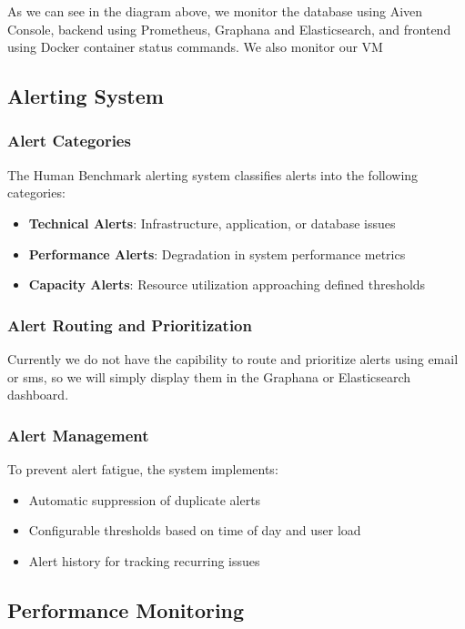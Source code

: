 As we can see in the diagram above, we monitor the database using Aiven Console,
backend using Prometheus, Graphana and Elasticsearch, and frontend using Docker
container status commands. We also monitor our VM

\subsection{Alerting System}

\subsubsection{Alert Categories}

The Human Benchmark alerting system classifies alerts into the following categories:

\begin{itemize}
    \item \textbf{Technical Alerts}: Infrastructure, application, or database issues
    \item \textbf{Performance Alerts}: Degradation in system performance metrics
    \item \textbf{Capacity Alerts}: Resource utilization approaching defined thresholds
\end{itemize}

\subsubsection{Alert Routing and Prioritization}
Currently we do not have the capibility to route and prioritize alerts using
email or sms, so we will simply display them in the Graphana or Elasticsearch
dashboard.

\subsubsection{Alert Management}

To prevent alert fatigue, the system implements:

\begin{itemize}
    \item Automatic suppression of duplicate alerts
    \item Configurable thresholds based on time of day and user load
    \item Alert history for tracking recurring issues
\end{itemize}


\subsection{Performance Monitoring}

